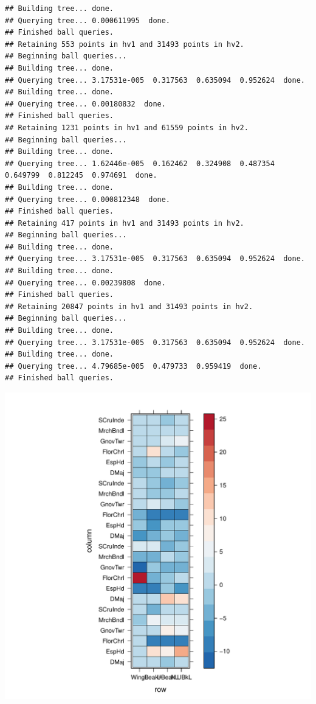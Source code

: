\documentclass[12pt]{article}\usepackage[]{graphicx}\usepackage[]{color}
\makeatletter
\def\maxwidth{ %
  \ifdim\Gin@nat@width>\linewidth
    \linewidth
  \else
    \Gin@nat@width
  \fi
}
\newenvironment{kframe}{%
 \def\at@end@of@kframe{}%
 \ifinner\ifhmode%
  \def\at@end@of@kframe{\end{minipage}}%
  \begin{minipage}{\columnwidth}%
 \fi\fi%
 \def\FrameCommand##1{\hskip\@totalleftmargin \hskip-\fboxsep
 \colorbox{shadecolor}{##1}\hskip-\fboxsep
     \hskip-\linewidth \hskip-\@totalleftmargin \hskip\columnwidth}%
 \MakeFramed {\advance\hsize-\width
   \@totalleftmargin\z@ \linewidth\hsize
   \@setminipage}}%
 {\par\unskip\endMakeFramed%
 \at@end@of@kframe}
\newenvironment{knitrout}{}{} %
\makeatother
\begin{document}
\begin{knitrout}
\begin{kframe}
\begin{verbatim}
## Building tree... done.
## Querying tree... 0.000611995  done.
## Finished ball queries. 
## Retaining 553 points in hv1 and 31493 points in hv2.
## Beginning ball queries... 
## Building tree... done.
## Querying tree... 3.17531e-005  0.317563  0.635094  0.952624  done.
## Building tree... done.
## Querying tree... 0.00180832  done.
## Finished ball queries. 
## Retaining 1231 points in hv1 and 61559 points in hv2.
## Beginning ball queries... 
## Building tree... done.
## Querying tree... 1.62446e-005  0.162462  0.324908  0.487354  0.649799  0.812245  0.974691  done.
## Building tree... done.
## Querying tree... 0.000812348  done.
## Finished ball queries. 
## Retaining 417 points in hv1 and 31493 points in hv2.
## Beginning ball queries... 
## Building tree... done.
## Querying tree... 3.17531e-005  0.317563  0.635094  0.952624  done.
## Building tree... done.
## Querying tree... 0.00239808  done.
## Finished ball queries. 
## Retaining 20847 points in hv1 and 31493 points in hv2.
## Beginning ball queries... 
## Building tree... done.
## Querying tree... 3.17531e-005  0.317563  0.635094  0.952624  done.
## Building tree... done.
## Querying tree... 4.79685e-005  0.479733  0.959419  done.
## Finished ball queries.
\end{verbatim}
\end{kframe}
\includegraphics[width=\maxwidth]{figure/unnamed-chunk-571} 


\end{knitrout}
\end{document}
